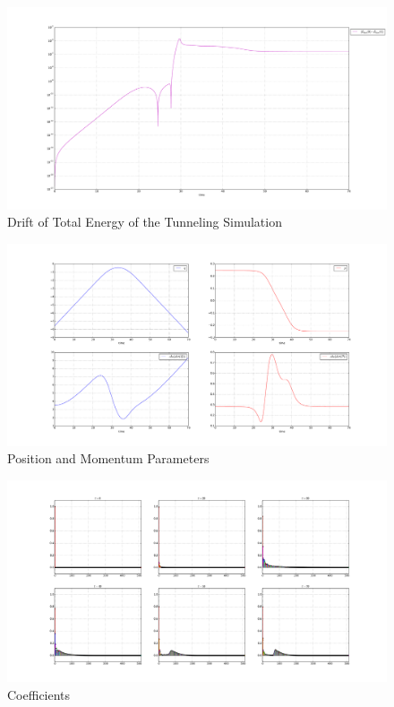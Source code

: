 \begin{figure}
\includegraphics[width=\textwidth]{Figures/tunneling_drift.pdf}
\caption{Drift of Total Energy of the Tunneling Simulation}
\label{fig:tunneling_drift}
\end{figure} 	 	
\begin{figure}
\includegraphics[width=\textwidth]{Figures/tunneling_params.pdf}
\caption{Position and Momentum Parameters}
\label{fig:tunneling_params}
\end{figure}
\begin{figure}
\includegraphics[width=\textwidth]{Figures/tunneling_coeffs.pdf}
\caption{Coefficients}
\label{fig:tunneling_coeffs}
\end{figure}


